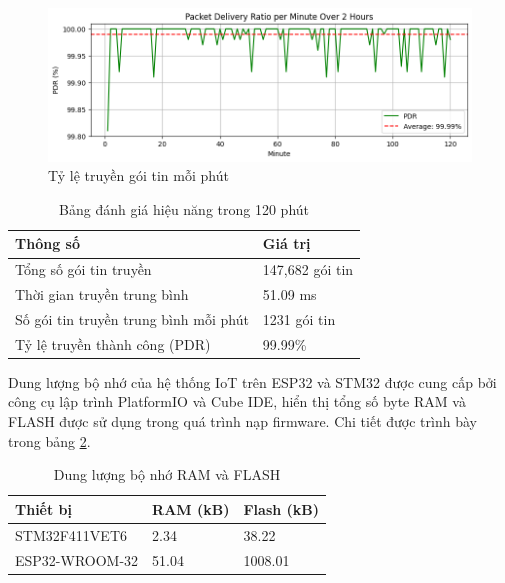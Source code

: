 \begin{figure}[H]
    \centering
    \includegraphics[width=0.8\linewidth]{pdr2.png}
    \caption{Tỷ lệ truyền gói tin mỗi phút}
    \label{fig:pdr}
\end{figure}

\begin{table}[H]
    \centering
    \small
    \caption{Bảng đánh giá hiệu năng trong 120 phút}
    \label{tab:performance_metrics}
    \begin{tabular}{|p{10cm}|p{4cm}|}
        \hline
        \textbf{Thông số} & \textbf{Giá trị} \\
        \hline
        Tổng số gói tin truyền & 147,682 gói tin \\
        Thời gian truyền trung bình & 51.09 ms \\
        Số gói tin truyền trung bình mỗi phút & 1231 gói tin \\
        Tỷ lệ truyền thành công (PDR) & 99.99\% \\
        \hline
    \end{tabular}
\end{table}

Dung lượng bộ nhớ của hệ thống IoT trên ESP32 và STM32 được cung cấp bởi công cụ lập trình PlatformIO và Cube IDE, hiển thị tổng số byte RAM và FLASH được sử dụng trong quá trình nạp firmware. Chi tiết được trình bày trong bảng \ref{tab:memory}.

\begin{table}[h]
\centering
\small
\caption{Dung lượng bộ nhớ RAM và FLASH}
\label{tab:memory}
\begin{tabular}{|p{4cm}|p{5cm}|p{3cm}|}
\hline
Thiết bị & RAM (kB) & Flash (kB) \\
\hline
STM32F411VET6   & 2.34  & 38.22  \\
ESP32-WROOM-32  & 51.04 & 1008.01 \\
\hline
\end{tabular}
\end{table}

